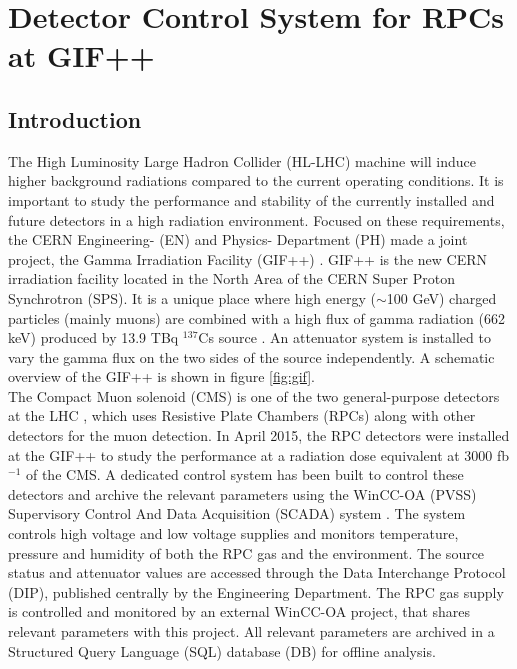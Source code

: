 \graphicspath{{chapt_dutch/}{intro/}{chapt2/}{chapt3/}{chapt4/}{chapt5/}{chapt6/}{chapt7/}{chapt8/}}

\renewcommand\evenpagerightmark{{\scshape\small Chapter 8}}
\renewcommand\oddpageleftmark{{\scshape\small Detector Control System for RPCs at GIF++}}

\hyphenation{}

\chapter[Detector Control System for RPCs at GIF++]%
{Detector Control System for RPCs at GIF++}\label{chapt:10}

\section{Introduction}\label{sec:gif_intro}
The High Luminosity Large Hadron Collider (HL-LHC) machine will induce higher background radiations compared to the current operating conditions. It is important to study the performance and stability of the currently installed and future detectors in a high radiation environment. Focused on these requirements, the CERN Engineering- (EN) and Physics- Department (PH) made a joint project, the Gamma Irradiation Facility (GIF++) \cite{JAKEL2014}. GIF++ is the new CERN irradiation facility located in the North Area of the CERN Super Proton Synchrotron (SPS). It is a unique place where high energy ($\sim$100 GeV) charged particles (mainly muons) are combined with a high flux of gamma radiation (662 keV) produced by 13.9 TBq $^{137}$Cs source . An attenuator system is installed to vary the gamma flux on the two sides of the source independently. A schematic overview of the GIF++ is shown in figure \ref{fig:gif}.\\
The Compact Muon solenoid (CMS) is one of the two general-purpose detectors at the LHC \cite{cms-lhc}, which uses Resistive Plate Chambers (RPCs) along with other detectors \cite{muon-sys} for the muon detection. In April 2015, the RPC detectors were installed at the GIF++ to study the performance at a radiation dose equivalent at 3000 fb$^{-1}$ of the CMS. A dedicated control system has been built to control these detectors and archive the relevant parameters using the WinCC-OA (PVSS) Supervisory Control And Data Acquisition (SCADA) system \cite{twiki:wincc-oa}. The system controls high voltage and low voltage supplies and monitors temperature, pressure and humidity of both the RPC gas and the environment. The source status and attenuator values are accessed through the Data Interchange Protocol (DIP), published centrally by the Engineering Department. The RPC gas supply is controlled and monitored by an external WinCC-OA project, that shares relevant parameters with this project. All relevant parameters are archived in a Structured Query Language (SQL) database (DB) for offline analysis.\\
